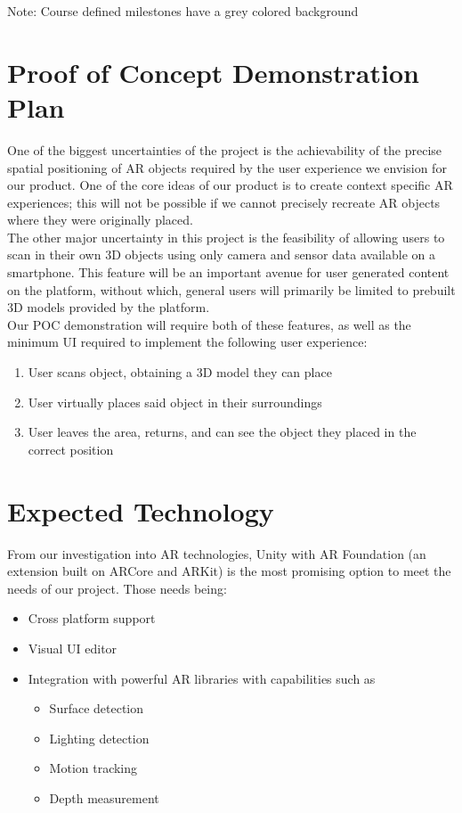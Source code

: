 \documentclass{article}
\begin{document}
Note: Course defined milestones have a \colorbox{course-defined}{grey colored background}

\section{Proof of Concept Demonstration Plan}

One of the biggest uncertainties of the project is the achievability of 
the precise spatial positioning of AR objects required by the user experience we envision for our product. 
One of the core ideas of our product is to create context specific AR experiences; 
this will not be possible if we cannot precisely recreate AR objects where they were originally placed.\\

The other major uncertainty in this project is the feasibility of 
allowing users to scan in their own 3D objects using only camera and sensor data available on a smartphone. 
This feature will be an important avenue for user generated content on the platform, 
without which, general users will primarily be limited to prebuilt 3D models provided by the platform.\\

Our POC demonstration will require both of these features, 
as well as the minimum UI required to implement the following user experience:\\

\begin{enumerate}
  \item User scans object, obtaining a 3D model they can place
  \item User virtually places said object in their surroundings
  \item User leaves the area, returns, and can see the object they placed in the correct position
\end{enumerate}


\section{Expected Technology}

From our investigation into AR technologies, Unity with AR Foundation (an extension built on ARCore and ARKit) is the most promising option to meet the needs of our project. Those needs being:
\begin{itemize}
  \item Cross platform support
  \item Visual UI editor
  \item Integration with powerful AR libraries with capabilities such as
  \begin{itemize}
        \item Surface detection
        \item Lighting detection
        \item Motion tracking
        \item Depth measurement
      \end{itemize}
\end{itemize}
\end{document}
